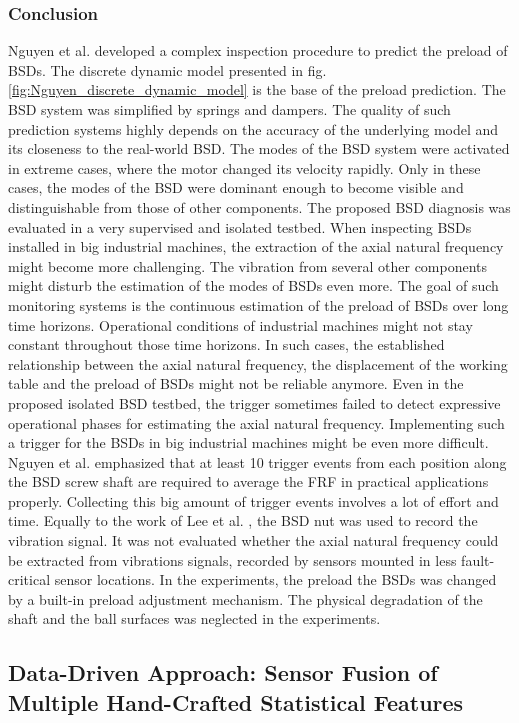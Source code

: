 \subsubsection{Conclusion}
Nguyen et al. \cite{NGUYEN2019} developed a complex inspection procedure to predict the preload of BSDs. The discrete dynamic model presented in fig. \ref{fig:Nguyen_discrete_dynamic_model} is the base of the preload prediction. The BSD system was simplified by springs and dampers. The quality of such prediction systems highly depends on the accuracy of the underlying model and its closeness to the real-world BSD. The modes of the BSD system were activated in extreme cases, where the motor changed its velocity rapidly. Only in these cases, the modes of the BSD were dominant enough to become visible and distinguishable from those of other components. The proposed BSD diagnosis was evaluated in a very supervised and isolated testbed. When inspecting BSDs installed in big industrial machines, the extraction of the axial natural frequency might become more challenging. The vibration from several other components might disturb the estimation of the modes of BSDs even more. The goal of such monitoring systems is the continuous estimation of the preload of BSDs over long time horizons. Operational conditions of industrial machines might not stay constant throughout those time horizons. In such cases, the established relationship between the axial natural frequency, the displacement of the working table and the preload of BSDs might not be reliable anymore. Even in the proposed isolated BSD testbed, the trigger sometimes failed to detect expressive operational phases for estimating the axial natural frequency. Implementing such a trigger for the BSDs in big industrial machines might be even more difficult. Nguyen et al. \cite{NGUYEN2019} emphasized that at least 10 trigger events from each position along the BSD screw shaft are required to average the FRF in practical applications properly. Collecting this big amount of trigger events involves a lot of effort and time. Equally to the work of Lee et al. \cite{Lee2015}, the BSD nut was used to record the vibration signal. It was not evaluated whether the axial natural frequency could be extracted from vibrations signals, recorded by sensors mounted in less fault-critical sensor locations. In the experiments, the preload the BSDs was changed by a built-in preload adjustment mechanism. The physical degradation of the shaft and the ball surfaces was neglected in the experiments.

\subsection{Data-Driven Approach: Sensor Fusion of Multiple Hand-Crafted Statistical Features}

